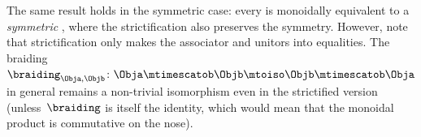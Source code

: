 \begin{remark}
    The same result holds in the symmetric case: every  is monoidally equivalent to a \emph{symmetric} , where the strictification also preserves the symmetry.
    However, note that strictification only makes the associator and unitors into equalities.
    The braiding~$\braiding_{\Obja,\Objb} \colon \Obja \mtimescatob \Objb \mtoiso \Objb \mtimescatob \Obja$ in general remains a non-trivial isomorphism even in the strictified version (unless~$\braiding$ is itself the identity, which would mean that the monoidal product is commutative on the nose).
\end{remark}




